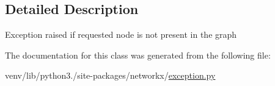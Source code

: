 \subsection{Detailed Description}
\begin{DoxyVerb}Exception raised if requested node is not present in the graph\end{DoxyVerb}
 

The documentation for this class was generated from the following file\+:\begin{DoxyCompactItemize}
\item 
venv/lib/python3./site-\/packages/networkx/\hyperlink{exception_8py}{exception.\+py}\end{DoxyCompactItemize}
